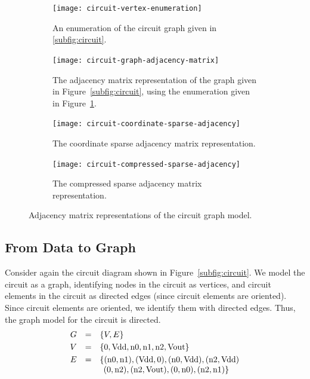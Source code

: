 \begin{figure}[bh]
  \begin{subfigure}[t]{0.175\textwidth}
    \centering
    \texttt{[image: circuit-vertex-enumeration]}
    \caption{\label{fig:circuit-vertex-enumeration}
    An enumeration of the circuit graph given in \protect\ref{subfig:circuit}.}
  \end{subfigure}
  \hspace{1em}
  \begin{subfigure}[t]{0.25\textwidth}
    \centering
    \texttt{[image: circuit-graph-adjacency-matrix]}
    \caption{\label{fig:circuit-graph-adjacency-matrix}
    The adjacency matrix representation of the graph given in Figure~\protect\ref{subfig:circuit},
    using the enumeration given in Figure~\protect\ref{fig:circuit-vertex-enumeration}.}
  \end{subfigure}
  \hspace{1em}
  \begin{subfigure}[t]{0.175\textwidth}
    \small
    \centering
    \texttt{[image: circuit-coordinate-sparse-adjacency]}
    \caption{\label{fig:circuit-coordinate-sparse-adjacency}
    The coordinate sparse adjacency matrix representation.}
  \end{subfigure}
  \hspace{1em}
  \begin{subfigure}[t]{0.3\textwidth}
    \small
    \centering
    \texttt{[image: circuit-compressed-sparse-adjacency]}
    \caption{\label{fig:circuit-compressed-sparse-adjacency}
    The compressed sparse adjacency matrix representation.}
  \end{subfigure}
  \caption{Adjacency matrix representations of the circuit graph model.\label{fig:circuit-model}}
\end{figure}


\subsection{From Data to Graph}


Consider again the circuit diagram shown in Figure~\ref{subfig:circuit}.  We  model the circuit as a graph, identifying  nodes in the circuit as vertices, and circuit elements in the circuit as directed edges (since circuit elements are oriented).
 Since circuit elements are oriented, we identify them with directed edges.  Thus, the graph model for the
circuit is directed.  
\[
\begin{array}{rcl}
  G & = & \{ V, E \} \\[\smallskipamount]
        V & = & \{ \mathrm{0}, \mathrm{Vdd}, \mathrm{n0}, \mathrm{n1}, \mathrm{n2}, \mathrm{Vout} \} \\[\smallskipamount]
        E & = & \{
        ( \mathrm{n0}, \mathrm{n1} ),  ( \mathrm{Vdd}, \mathrm{0} ),
        ( \mathrm{n0}, \mathrm{Vdd} ), ( \mathrm{n2}, \mathrm{Vdd} )\\
        &&\:\:
        ( \mathrm{0}, \mathrm{n2} ),  ( \mathrm{n2}, \mathrm{Vout} ),
        ( \mathrm{0}, \mathrm{n0} ),  ( \mathrm{n2}, \mathrm{n1} ) \}
      \end{array}
\]


